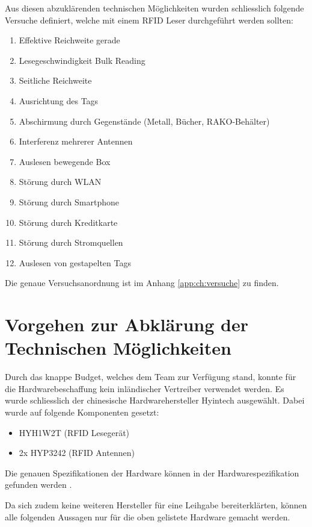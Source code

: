 Aus diesen abzuklärenden technischen Möglichkeiten wurden schliesslich folgende Versuche definiert, welche mit einem RFID Leser durchgeführt werden sollten:
\begin{enumerate}
	\item Effektive Reichweite gerade
	\item Lesegeschwindigkeit Bulk Reading
	\item Seitliche Reichweite
	\item Ausrichtung des Tags
	\item Abschirmung durch Gegenstände (Metall, Bücher, RAKO-Behälter)
	\item Interferenz mehrerer Antennen
	\item Auslesen bewegende Box
	\item Störung durch WLAN
	\item Störung durch Smartphone
	\item Störung durch Kreditkarte
	\item Störung durch Stromquellen
	\item Auslesen von gestapelten Tags
\end{enumerate}

Die genaue Versuchsanordnung ist im Anhang \ref{app:ch:versuche} zu finden.

\section{Vorgehen zur Abklärung der Technischen Möglichkeiten}

Durch das knappe Budget, welches dem Team zur Verfügung stand, konnte für die Hardwarebeschaffung kein inländischer Vertreiber verwendet werden. Es wurde schliesslich der chinesische Hardwarehersteller Hyintech ausgewählt. Dabei wurde auf folgende Komponenten gesetzt:

\begin{itemize}
	\item HYH1W2T (RFID Lesegerät)
	\item 2x HYP3242 (RFID Antennen)
\end{itemize}

Die genauen Spezifikationen der Hardware können in der Hardwarespezifikation gefunden werden \nocite{hyintech2019HYP3242} \nocite{hyintech2019HYH1WXT}.

Da sich zudem keine weiteren Hersteller für eine Leihgabe bereiterklärten, können alle folgenden Aussagen nur für die oben gelistete Hardware gemacht werden.

